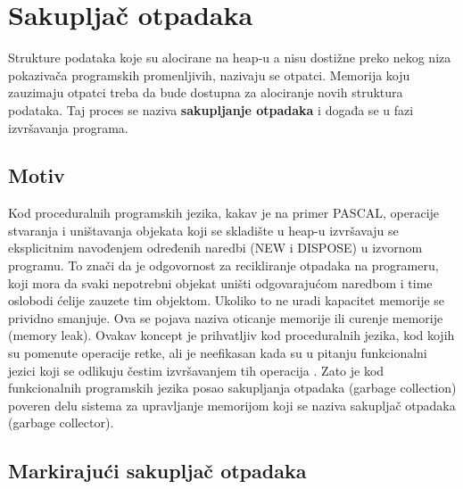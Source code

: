 \section{Sakupljač otpadaka}
\label{sec:djubretar}


Strukture podataka koje su alocirane na heap-u a nisu dostižne preko nekog niza pokazivača programskih promenljivih, nazivaju se otpatci.
Memorija koju zauzimaju otpatci treba da bude dostupna za alociranje novih struktura podataka.
Taj proces se naziva \textbf{sakupljanje otpadaka} i događa se u fazi izvršavanja programa.

\subsection{Motiv}

Kod proceduralnih programskih jezika, kakav je na primer PASCAL,
operacije stvaranja i uništavanja objekata koji se skladište u heap-u izvršavaju se eksplicitnim navođenjem određenih naredbi (NEW i DISPOSE) u izvornom programu.
To znači da je odgovornost za recikliranje otpadaka na programeru, koji mora da svaki nepotrebni objekat uništi odgovarajućom naredbom i time oslobodi ćelije zauzete tim objektom.
Ukoliko to ne uradi kapacitet memorije se prividno smanjuje. Ova se pojava naziva oticanje memorije ili curenje memorije (memory leak). 
Ovakav koncept je prihvatljiv kod proceduralnih jezika, kod kojih su pomenute operacije retke, ali je neefikasan kada su u pitanju funkcionalni jezici koji se odlikuju čestim izvršavanjem tih operacija \cite{appel}.
Zato je kod funkcionalnih programskih jezika posao sakupljanja otpadaka
(garbage collection) poveren delu sistema za upravljanje memorijom koji se naziva sakupljač otpadaka (garbage collector).

\subsection{Markirajući sakupljač otpadaka}

